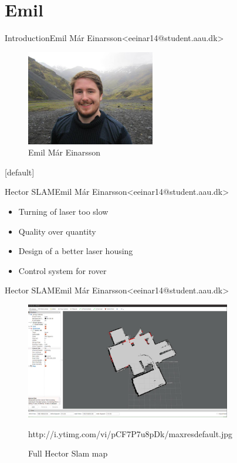 \section{Emil}


\begin{frame}{Introduction}{Emil Már Einarsson\newline<eeinar14@student.aau.dk>}
	\begin{figure}[h!]
    	\includegraphics[width=0.5\textwidth]{images/emil.jpg}
    	\caption{Emil Már Einarsson}
		\centering    		
	\end{figure}
\end{frame}

[default]

\begin{frame}{Hector SLAM}{Emil Már Einarsson\newline<eeinar14@student.aau.dk>}
  \begin{itemize}
  	\item <2-> Turning of laser too slow
  	\item <3-> Quality over quantity
  	\item <4-> Design of a better laser housing
  	\item <5-> Control system for rover
  \end{itemize}
\end{frame}

\begin{frame}{Hector SLAM}{Emil Már Einarsson\newline<eeinar14@student.aau.dk>}
	\begin{figure}[h!]
    	\includegraphics[width=0.8\textwidth]{images/hectorslam.jpg}
    	\caption{Full Hector Slam map}
    	\tiny{http://i.ytimg.com/vi/pCF7P7u8pDk/maxresdefault.jpg}
		\centering    		
	\end{figure}
\end{frame}

